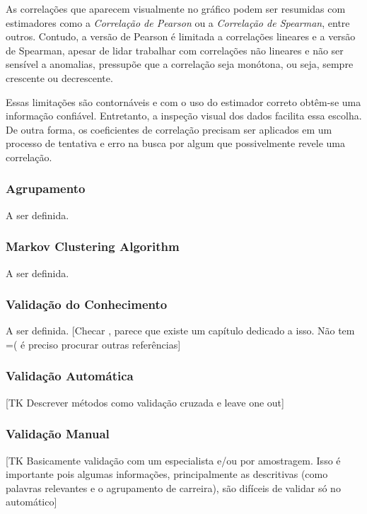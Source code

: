 \documentclass[12pt,a4paper]{article}
\begin{document}
As correlações que aparecem visualmente no gráfico podem ser resumidas com estimadores como a \textit{Correlação de Pearson} ou a \textit{Correlação de Spearman}, entre outros. Contudo, a versão de Pearson é limitada a correlações lineares e a versão de Spearman, apesar de lidar trabalhar com correlações não lineares e não ser sensível a anomalias, pressupõe que a correlação seja monótona, ou seja, sempre crescente ou decrescente.

Essas limitações são contornáveis e com o uso do estimador correto obtêm-se uma informação confiável. Entretanto, a inspeção visual dos dados facilita essa escolha. De outra forma, os coeficientes de correlação precisam ser aplicados em um processo de tentativa e erro na busca por algum que possivelmente revele uma correlação.

\subsubsection{Agrupamento}

A ser definida.

\subsubsection*{Markov Clustering Algorithm}

A ser definida.

\subsubsection{Validação do Conhecimento}

A ser definida. [Checar \cite{Witten2016-vt}, parece que existe um capítulo dedicado a isso. Não tem =( é preciso procurar outras referências]

\subsubsection*{Validação Automática}

[TK Descrever métodos como validação cruzada e leave one out]

\subsubsection*{Validação Manual}

[TK Basicamente validação com um especialista e/ou por amostragem. Isso é importante pois algumas informações, principalmente as descritivas (como palavras relevantes e o agrupamento de carreira), são difíceis de validar só no automático]
\end{document}
